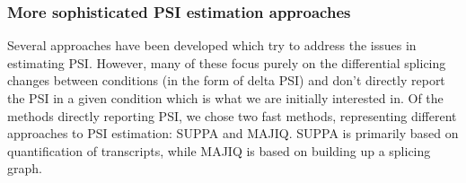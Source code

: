 



\subsubsection{More sophisticated PSI estimation approaches}

Several approaches have been developed which try to address the issues in estimating PSI. However, many of these focus purely on the differential splicing changes between conditions (in the form of delta PSI) and don't directly report the PSI in a given condition which is what we are initially interested in. Of the methods directly reporting PSI, we chose two fast methods, representing different approaches to PSI estimation: SUPPA and MAJIQ. SUPPA is primarily based on quantification of transcripts, while MAJIQ is based on building up a splicing graph. %


